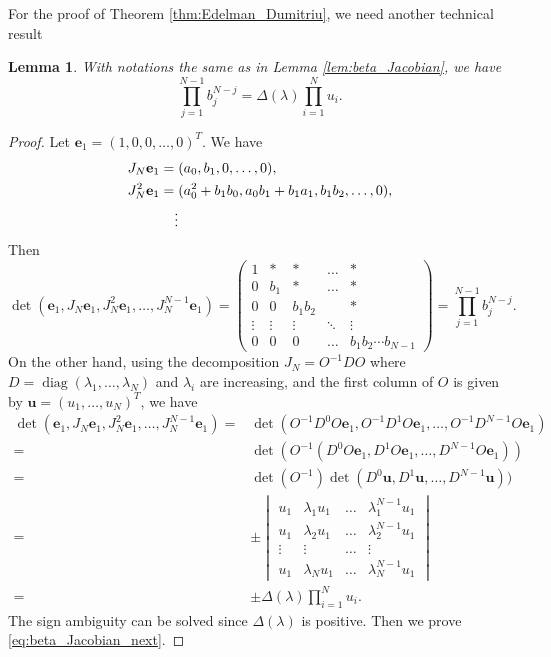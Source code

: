 \documentclass[11pt, a4paper]{article}
\numberwithin{equation}{section}
\renewcommand{\vec}[1]{\mathbf{#1}}
\DeclareMathOperator{\diag}{diag}
\newtheorem{lem}{Lemma}
\theoremstyle{definition}
\theoremstyle{remark}
\begin{document}
For the proof of Theorem \ref{thm:Edelman_Dumitriu}, we need another technical result
\begin{lem} \label{lem:beta_Jacobian_next}
  With notations the same as in Lemma \ref{lem:beta_Jacobian}, we have
  \begin{equation} \label{eq:beta_Jacobian_next}
    \prod^{N - 1}_{j = 1} b^{N - j}_j = \Delta(\lambda) \prod^N_{i = 1} u_i.
  \end{equation}
\end{lem}
\begin{proof}
  Let $\vec{e}_1 = (1, 0, 0, \dotsc, 0)^T$. We have
  \begin{align}
    J_N \vec{e}_1 = {}& (a_0, b_1, 0, \dotsc, 0), \\
    J^2_N \vec{e}_1 = {}& (a^2_0 + b_1 b_0, a_0 b_1 + b_1 a_1, b_1 b_2, \dotsc, 0), \\
    \vdots {}& \notag
  \end{align}
  Then
  \begin{equation}
    \det(\vec{e}_1, J_N \vec{e}_1, J^2_N \vec{e}_1, \dotsc, J^{N - 1}_N \vec{e}_1) =
    \begin{pmatrix}
      1 & * & * & \dots & * \\
      0 & b_1 & * & \dots & * \\
      0 & 0 & b_1 b_2 & & * \\
      \vdots & \vdots & \vdots & \ddots & \vdots \\
      0 & 0 & 0 & \dots & b_1 b_2 \dotsm b_{N - 1}
    \end{pmatrix}
    = \prod^{N - 1}_{j = 1} b^{N - j}_j.
  \end{equation}
  On the other hand, using the decomposition $J_N = O^{-1} D O$ where $D = \diag(\lambda_1, \dotsc, \lambda_N)$ and $\lambda_i$ are increasing, and the first column of $O$ is given by $\vec{u} = (u_1, \dotsc, u_N)^T$, we have
  \begin{equation}
    \begin{split}
      \det(\vec{e}_1, J_N \vec{e}_1, J^2_N \vec{e}_1, \dotsc, J^{N - 1}_N \vec{e}_1) = {}& \det(O^{-1} D^0 O \vec{e}_1, O^{-1} D^1 O \vec{e}_1, \dotsc, O^{-1} D^{N - 1} O \vec{e}_1) \\
      = {}& \det(O^{-1}(D^0 O \vec{e}_1, D^1 O \vec{e}_1, \dotsc, D^{N - 1} O \vec{e}_1)) \\
      = {}& \det(O^{-1}) \det(D^0 \vec{u}, D^1 \vec{u}, \dotsc, D^{N - 1} \vec{u})) \\
      = {}& \pm
      \begin{vmatrix}
        u_1 & \lambda_1 u_1 & \dots & \lambda^{N - 1}_1 u_1 \\
        u_1 & \lambda_2 u_1 & \dots & \lambda^{N - 1}_2 u_1 \\
        \vdots & \vdots & \dots & \vdots \\
        u_1 & \lambda_N u_1 & \dots & \lambda^{N - 1}_N u_1
      \end{vmatrix} \\
      = {}& \pm \Delta(\lambda) \prod^N_{i = 1} u_i.
    \end{split}
  \end{equation}
  The sign ambiguity can be solved since $\Delta(\lambda)$ is positive. Then we prove \eqref{eq:beta_Jacobian_next}.
\end{proof}
\end{document}
